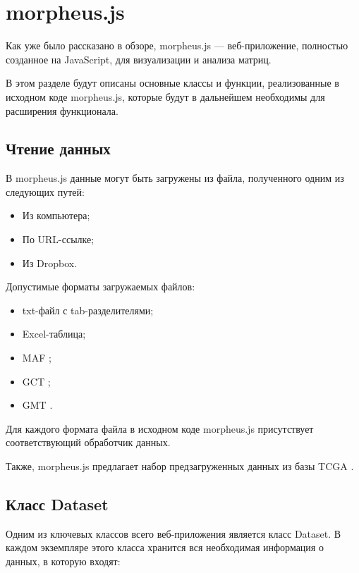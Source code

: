 \documentclass[specification,annotation]{itmo-student-thesis}
\begin{document}
\section{morpheus.js}
Как уже было рассказано в обзоре, morpheus.js --- веб-приложение, полностью созданное на JavaScript, для визуализации и анализа матриц.

В этом разделе будут описаны основные классы и функции, реализованные в исходном коде morpheus.js, которые будут в дальнейшем необходимы для расширения функционала.

\subsection{Чтение данных}
В morpheus.js данные могут быть загружены из файла, полученного одним из следующих путей:
\begin{itemize}
\item Из компьютера;
\item По URL-ссылке;
\item Из Dropbox.
\end{itemize}

Допустимые форматы загружаемых файлов:
\begin{itemize}
\item txt-файл с tab-разделителями;
\item Excel-таблица;
\item MAF \cite{maf};
\item GCT \cite{gct};
\item GMT \cite{gmt}.
\end{itemize}

Для каждого формата файла в исходном коде morpheus.js присутствует соответствующий обработчик данных.

Также, morpheus.js предлагает набор предзагруженных данных из базы TCGA \cite{tcga}.

\subsection{Класс Dataset}
Одним из ключевых классов всего веб-приложения является класс Dataset. В каждом экземпляре этого класса хранится вся необходимая информация о данных, в которую входят:
\end{document}
